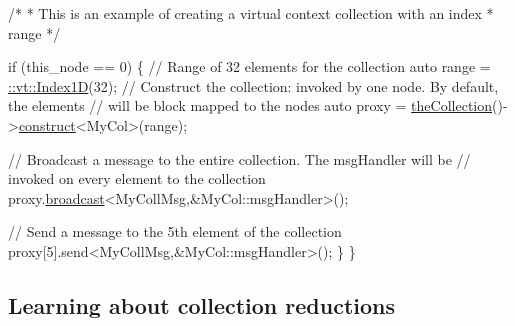 \begin{DoxyCodeInclude}
  \textcolor{comment}{/*}
\textcolor{comment}{   * This is an example of creating a virtual context collection with an index}
\textcolor{comment}{   * range}
\textcolor{comment}{   */}

  \textcolor{keywordflow}{if} (this\_node == 0) \{
    \textcolor{comment}{// Range of 32 elements for the collection}
    \textcolor{keyword}{auto} range = \hyperlink{namespacevt_1_1index_a091a4f5a7a2c993d9727eaa60cf67d81}{::vt::Index1D}(32);
    \textcolor{comment}{// Construct the collection: invoked by one node. By default, the elements}
    \textcolor{comment}{// will be block mapped to the nodes}
    \textcolor{keyword}{auto} proxy = \hyperlink{namespacevt_a1c45ce63bfd2c327ff7d76a319a371d8}{theCollection}()->\hyperlink{structvt_1_1vrt_1_1collection_1_1_collection_manager_a4de84e9efd7a3948e3c20be549441cfd}{construct}<MyCol>(range);

    \textcolor{comment}{// Broadcast a message to the entire collection. The msgHandler will be}
    \textcolor{comment}{// invoked on every element to the collection}
    proxy.\hyperlink{structvt_1_1objgroup_1_1proxy_1_1_proxy_a0b716ca776b1f06e0d7d45afbe9e5274}{broadcast}<MyCollMsg,&MyCol::msgHandler>();

    \textcolor{comment}{// Send a message to the 5th element of the collection}
    proxy[5].send<MyCollMsg,&MyCol::msgHandler>();
  \}
\}
\end{DoxyCodeInclude}
\hypertarget{tutorial-2b}{}\subsection{Learning about collection reductions}\label{tutorial-2b}


